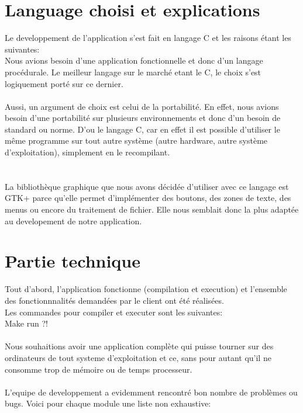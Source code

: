 \documentclass[a4]{article}
\begin{document}
	\section{Language choisi et explications}
	
	Le developpement de l'application s'est fait en langage C et les raisons étant les suivantes: \\
	
Nous avions besoin d'une application fonctionnelle et donc d'un langage procédurale. Le meilleur langage sur le marché
etant le C, le choix s'est logiquement porté sur ce dernier.\\ \\

Aussi, un argument de choix est celui de la portabilité. En effet, nous avions besoin d'une portabilité sur plusieurs
environnements et donc d'un besoin de standard ou norme. D'ou le langage C, car en effet il est possible d'utiliser
 le même programme sur tout autre système
 (autre hardware, autre système d'exploitation), simplement en le recompilant. \\ \\ \\



La bibliothèque graphique que nous avons décidée d'utiliser avec ce langage est GTK+ 
		parce qu'elle permet d'implémenter des boutons, des zones de texte, des menus ou encore du traitement de fichier.
		Elle nous semblait donc la plus adaptée au developement de notre application.
	\section{Partie technique}
	
	Tout d'abord, l'application fonctionne (compilation et execution) et
	l'ensemble des fonctionnnalités demandées par le client ont été réalisées.\\ 
	Les commandes pour compiler et executer sont les suivantes:\\
	Make run ?!
	\\ \\
	
	
	Nous souhaitions avoir une application complète qui puisse tourner sur des ordinateurs 
de tout systeme d'exploitation et ce, sans pour autant qu’il ne
consomme trop de mémoire ou de temps processeur. \\ \\
	
	L'equipe de developpement a evidemment rencontré bon nombre de problèmes ou bugs. Voici pour chaque
	module une liste non exhaustive:
\end{document}
